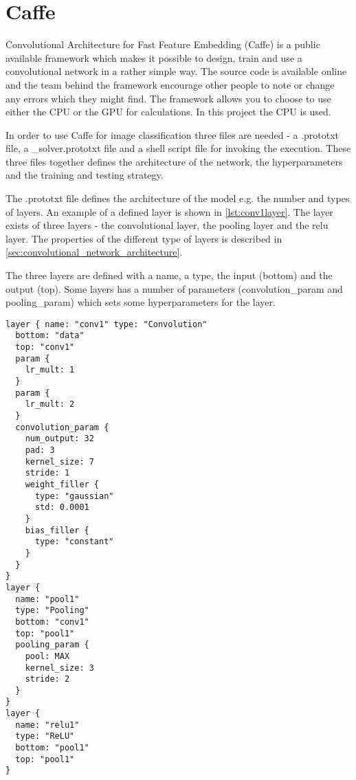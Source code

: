 \graphicspath{{Chapters/Project/}}

\section{Caffe} %
\label{sec:caffe}

Convolutional Architecture for Fast Feature Embedding (Caffe) is a public
available framework which makes it possible to design, train and use a
convolutional network in a rather simple way. The source code is available
online and the team behind the framework encourage other people to note or
change any errors which they might find. The framework allows you to choose to
use either the CPU or the GPU for calculations. In this project the CPU is used.

In order to use Caffe for image classification three files are needed - a
.prototxt file, a \_solver.prototxt file and a shell script file for invoking
the execution.
These three files together defines the architecture of the network, the
hyperparameters and the training and testing strategy.

The .prototxt file defines the architecture of the model e.g. the number and
types of layers. An example of a defined layer is shown in
\autoref{lst:conv1layer}. The layer exists of three layers - the convolutional
layer, the pooling layer and the relu layer. The properties of the different
type of layers is described in \autoref{sec:convolutional_network_architecture}.

The three layers are defined with a name, a type, the input (bottom) and the
output (top). Some layers has a number of parameters (convolution\_param and
pooling\_param) which sets some hyperparameters for the layer.

\begin{lstlisting}[caption = A code snippet from the file
cifar10\_quick\_train\_test.prototxt from the Cifar-10 tutorial provided by the
framework. This code snippet defines the first convolutional layer in the
network., label={lst:conv1layer}] layer { name: "conv1" type: "Convolution"
  bottom: "data"
  top: "conv1"
  param {
    lr_mult: 1
  }
  param {
    lr_mult: 2
  }
  convolution_param {
    num_output: 32
    pad: 3
    kernel_size: 7
    stride: 1
    weight_filler {
      type: "gaussian"
      std: 0.0001
    }
    bias_filler {
      type: "constant"
    }
  }
}
layer {
  name: "pool1"
  type: "Pooling"
  bottom: "conv1"
  top: "pool1"
  pooling_param {
    pool: MAX
    kernel_size: 3
    stride: 2
  }
}
layer {
  name: "relu1"
  type: "ReLU"
  bottom: "pool1"
  top: "pool1"
}
\end{lstlisting}

